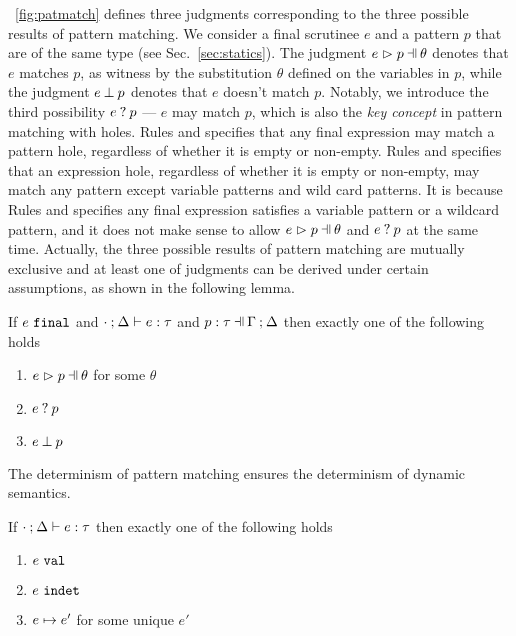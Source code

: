 \documentclass[runningheads,envcountsame,a4paper]{llncs}
\begin{document}


\figurename~\ref{fig:patmatch} defines three judgments corresponding to the
three possible results of pattern matching. We consider a final scrutinee $e$
and a pattern $p$ that are of the same type (see Sec.~\ref{sec:statics}). The
judgment $\hpatmatch{e}{p}{\theta}$ denotes that $e$ matches $p$, as witness by
the substitution $\theta$ defined on the variables in $p$, while the judgment
$e \mathbin{\bot} p$ denotes that $e$ doesn't match $p$. Notably, we introduce the
third possibility $e \mathbin{?} p$ --- $e$ may match $p$, which is also the
\textit{key concept} in pattern matching with holes. Rules \MMEHole and \MMHole
specifies that any final expression may match a pattern hole, regardless of
whether it is empty or non-empty. Rules \MMExpEHole and \MMExpHole specifies
that an expression hole, regardless of whether it is empty or non-empty, may
match any pattern except variable patterns and wild card patterns. It is because
Rules \MVar and \MWild specifies any final expression satisfies a variable
pattern or a wildcard pattern, and it does not make sense to allow
$\hpatmatch{e}{p}{\theta}$ and $e \mathbin{?} p$ at the same time. Actually,
the three possible results of pattern matching are mutually exclusive and at
least one of judgments can be derived under certain assumptions, as shown in the
following lemma.

\begin{lemma}
  \label{lem:match-determinism}
  If $e ~\mathtt{final}$ and $\cdot \mathbin{;} \Delta \vdash e : \tau$ and $\hpattyp{p}{\tau}{\Gamma}{\Delta}$ then exactly one of the following holds
  \begin{enumerate}
    \item $\hpatmatch{e}{p}{\theta}$ for some $\theta$
    \item $e \mathbin{?} p$
    \item $e \mathbin{\bot} p$
  \end{enumerate}
\end{lemma}

The determinism of pattern matching ensures the determinism of dynamic semantics.

\begin{theorem}[Determinism]
  \label{thrm:determinism}
  If $\cdot \mathbin{;} \Delta \vdash e : \tau$ then exactly one of the following holds
  \begin{enumerate}
    \item $e ~\mathtt{val}$
    \item $e ~\mathtt{indet}$
    \item $e \mapsto e'$ for some unique $e'$
  \end{enumerate}
\end{theorem}
\end{document}
